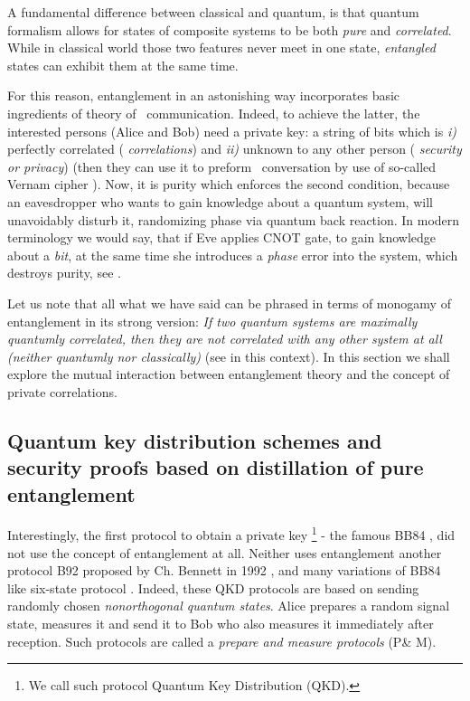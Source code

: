 \documentclass[rmp,12pt,preprint]{revtex4-2}
\begin{document}
A fundamental difference between classical and quantum, is that
quantum formalism allows for states of composite systems to be both
{\it pure} and {\it correlated}. While in classical world those two
features never meet in one state, {\it entangled} states can exhibit
them at the same time.

For this reason, entanglement in an astonishing way incorporates basic
ingredients of theory of \secure\ communication. Indeed, to achieve
the latter, the interested persons (Alice and Bob) need a private key:
a string of bits which is {\it i)} perfectly correlated ({\it
  correlations}) and {\it ii)} unknown to any other person ({\it
  security or privacy}) (then they can use it to preform \private\
conversation by use of so-called Vernam cipher \cite{Vernam} ). Now, it is purity
which enforces the second condition, because an eavesdropper who wants
to gain knowledge about a quantum system, will unavoidably disturb it,
randomizing phase via quantum back reaction. In modern terminology we
would say, that if Eve applies CNOT gate, to gain knowledge about a
{\it bit}, at the same time she introduces a {\it phase} error into
the system, which destroys purity, see \cite{Zurek81}.

Let us note that all what we have said can be phrased in terms of
monogamy of entanglement in its strong version: {\it If two quantum
  systems are maximally quantumly correlated, then they are not
  correlated with any other system at all (neither quantumly nor
  classically)} (see \cite{KoashiW-monogamy} in this context). In this
section we shall explore the mutual interaction between entanglement
theory and the concept of private correlations.



\subsection{Quantum key distribution schemes and security proofs
based on distillation of pure entanglement}
\label{subsec:Pure_proofs}

Interestingly, the first protocol to obtain a private key \footnote{We
  call such protocol Quantum Key Distribution (QKD).} - the famous
BB84 \cite{BB84}, did not use the concept of entanglement at
all. Neither uses entanglement another protocol B92 proposed by
Ch. Bennett in 1992 \cite{B92}, and many variations of BB84 like
six-state protocol \cite{Bruss6state}. Indeed, these QKD protocols are
based on sending randomly chosen {\it nonorthogonal quantum
  states}. Alice prepares a random signal state, measures it and send
it to Bob who also measures it immediately after reception.  Such
protocols are called a {\it prepare and measure protocols} (P\& M).
\end{document}
